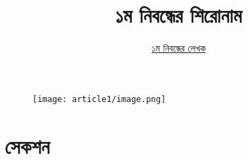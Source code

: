 \documentclass[12pt]{article}
\begin{document}
\begin{figure}[t]
        \centering 
        \texttt{[image: article1/image.png]}
\end{figure}

\title{১ম নিবন্ধের শিরোনাম}
\author{\href{https://github.com/rafisics/ebook-template}{১ম নিবন্ধের লেখক}}
\date{}


\section{সেকশন}

\lipsum[2]

\Blindtext 

\end{document}
